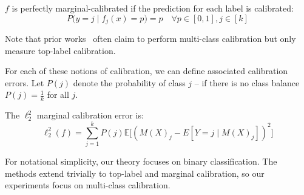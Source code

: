 \begin{definition}
$f$ is perfectly marginal-calibrated if the prediction for each label is calibrated:
\[ P\Big(y = j \; | \; f_j(x) = p\Big) = p \quad \forall p \in [0, 1], j \in [k] \]
\end{definition}

Note that prior works~\cite{guo2017calibration, hendrycks2019anomaly, hendrycks2019pretraining} often claim to perform multi-class calibration but only measure top-label calibration.

For each of these notions of calibration, we can define associated calibration errors.
Let $P(j)$ denote the probability of class $j$ -- if there is no class balance $P(j) = \frac{1}{k}$ for all $j$. 

\begin{definition}
The $\ell_2^2$ marginal calibration error is:
\[ \ell_2^2(f) = \sum_{j = 1}^k P(j) \mathbb{E}\big[ (M(X)_j - E[Y = j \; | \; M(X)_j])^2 \big] \]
\end{definition}


For notational simplicity, our theory focuses on binary classification.
The methods extend trivially to top-label and marginal calibration, so our experiments focus on multi-class calibration.

